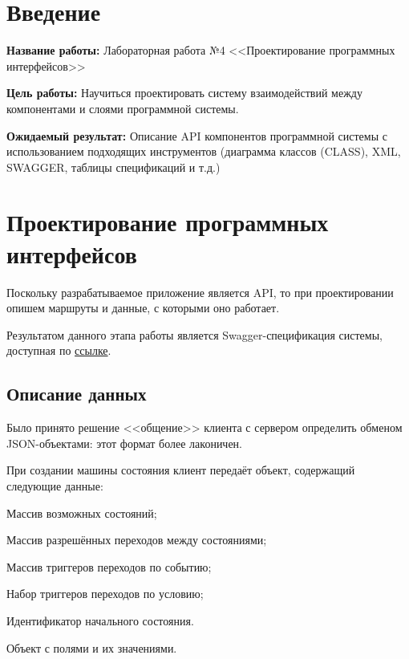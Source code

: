 \documentclass{hse_document}
\begin{document}

\tableofcontents
\clearpage

\section*{Введение} \label{Введение}

\textbf{Название работы:}
Лабораторная работа №4 <<Проектирование программных интерфейсов>>

\textbf{Цель работы:}
Научиться проектировать систему взаимодействий между компонентами и слоями программной системы.

\textbf{Ожидаемый результат:}
Описание API компонентов программной системы с использованием подходящих
инструментов (диаграмма классов (CLASS), XML, SWAGGER, таблицы спецификаций и
т.д.)

\section{Проектирование программных интерфейсов}\label{sec:interfaces}

Поскольку разрабатываемое приложение является API, то при проектировании опишем маршруты и данные,
с которыми оно работает.

Результатом данного этапа работы является Swagger-спецификация системы, доступная по \href{https://app.swaggerhub.com/apis/frogix/workflow-engine-api/1.0.0}{ссылке}.

\subsection{Описание данных}

Было принято решение <<общение>> клиента с сервером определить обменом JSON-объектами: этот формат более лаконичен.

При создании машины состояния клиент передаёт объект, содержащий следующие данные:

\begin{compactenum}
\item Массив возможных состояний;
\item Массив разрешённых переходов между состояниями;
\item Массив триггеров переходов по событию;
\item Набор триггеров переходов по условию;
\item Идентификатор начального состояния.
\item Объект с полями и их значениями.
\end{compactenum}
\end{document}
